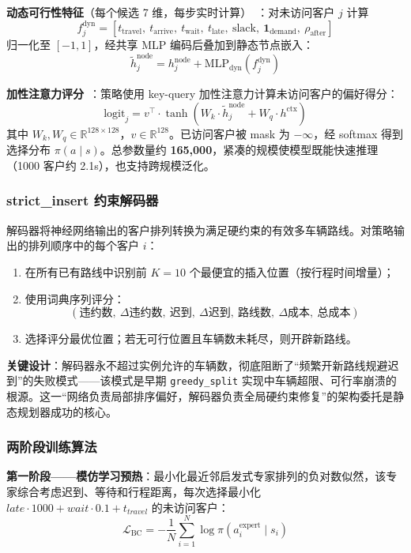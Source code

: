 \documentclass[12pt,a4paper,UTF8]{article}
\begin{document}
\textbf{动态可行性特征}（每个候选 7 维，每步实时计算）~\cite{falkner2020learning}：对未访问客户 $j$ 计算
\[
f^{\text{dyn}}_j = [t_{\text{travel}},\ t_{\text{arrive}},\ t_{\text{wait}},\ t_{\text{late}},\ \text{slack},\ \mathbf{1}_{\text{demand}},\ \rho_{\text{after}}]
\]
归一化至 $[-1, 1]$，经共享 MLP 编码后叠加到静态节点嵌入：
\[
\tilde{h}^{\text{node}}_j = h^{\text{node}}_j + \text{MLP}_{\text{dyn}}(f^{\text{dyn}}_j)
\]

\textbf{加性注意力评分}~\cite{kool2018attention}：策略使用 key-query 加性注意力计算未访问客户的偏好得分：
\[
\text{logit}_j = v^{\top} \cdot \tanh(W_k \cdot \tilde{h}^{\text{node}}_j + W_q \cdot h^{\text{ctx}})
\]
其中 $W_k, W_q \in \mathbb{R}^{128 \times 128}$，$v \in \mathbb{R}^{128}$。已访问客户被 mask 为 $-\infty$，经 softmax 得到选择分布 $\pi(a \mid s)$。总参数量约 \textbf{165,000}，紧凑的规模使模型既能快速推理（1000 客户约 2.1s），也支持跨规模泛化。

\subsubsection{strict\_insert 约束解码器}

解码器将神经网络输出的客户排列转换为满足硬约束的有效多车辆路线。对策略输出的排列顺序中的每个客户 $i$：

\begin{enumerate}
	\item 在所有已有路线中识别前 $K=10$ 个最便宜的插入位置（按行程时间增量）；
	\item 使用词典序列评分：
	\[
	(\text{违约数},\ \Delta\text{违约数},\ \text{迟到},\ \Delta\text{迟到},\ \text{路线数},\ \Delta\text{成本},\ \text{总成本})
	\]
	\item 选择评分最优位置；若无可行位置且车辆数未耗尽，则开辟新路线。
\end{enumerate}

\textbf{关键设计}：解码器永不超过实例允许的车辆数，彻底阻断了“频繁开新路线规避迟到”的失败模式——该模式是早期 \texttt{greedy\_split} 实现中车辆超限、可行率崩溃的根源。这一“网络负责局部排序偏好，解码器负责全局硬约束修复”的架构委托是静态规划器成功的核心。

\subsubsection{两阶段训练算法}

\textbf{第一阶段——模仿学习预热}：最小化最近邻启发式专家排列的负对数似然，该专家综合考虑迟到、等待和行程距离，每次选择最小化 $late\cdot 1000 + wait\cdot 0.1 + t_{travel}$ 的未访问客户：
\[
\mathcal{L}_{\text{BC}} = -\frac{1}{N}\sum_{i=1}^{N} \log \pi(a_i^{\text{expert}} \mid s_i)
\]
\end{document}
